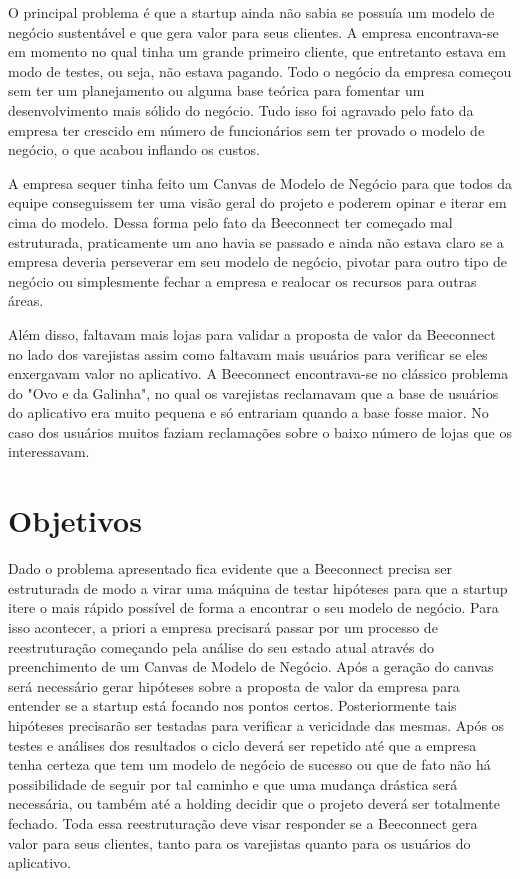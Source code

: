 O principal problema é que a startup ainda não sabia se possuía um modelo de negócio sustentável e que gera valor para seus clientes. A empresa encontrava-se em momento no qual tinha um grande primeiro cliente, que entretanto estava em modo de testes, ou seja, não estava pagando.
Todo o negócio da empresa começou sem ter um planejamento ou alguma base teórica para fomentar um desenvolvimento mais sólido do negócio. Tudo isso foi agravado pelo fato da empresa ter crescido em número de funcionários sem ter provado o modelo de negócio, o que acabou inflando os custos.

A empresa sequer tinha feito um Canvas de Modelo de Negócio para que todos da equipe conseguissem ter uma visão geral do projeto e poderem opinar e iterar em cima do modelo. Dessa forma pelo fato da Beeconnect ter começado mal estruturada, praticamente um ano havia se passado e ainda não estava claro se a empresa deveria perseverar em seu modelo de negócio, pivotar para outro tipo de negócio ou simplesmente fechar a empresa e realocar os recursos para outras áreas.

Além disso, faltavam mais lojas para validar a proposta de valor da Beeconnect no lado dos varejistas assim como faltavam mais usuários para verificar se eles enxergavam valor no aplicativo. A Beeconnect encontrava-se no clássico problema do "Ovo e da Galinha", no qual os varejistas reclamavam que a base de usuários do aplicativo era muito pequena e só entrariam quando a base fosse maior. No caso dos usuários muitos faziam reclamações sobre o baixo número de lojas que os interessavam.

\section[Objetivos]{Objetivos}
\label{chap:objetivos}
Dado o problema apresentado fica evidente que a Beeconnect precisa ser estruturada de modo a virar uma máquina de testar hipóteses para que a startup itere o mais rápido possível de forma a encontrar o seu modelo de negócio. Para isso acontecer, a priori a empresa precisará passar por um processo de reestruturação começando pela análise do seu estado atual através do preenchimento de um Canvas de Modelo de Negócio. Após a geração do canvas será necessário gerar hipóteses sobre a proposta de valor da empresa para entender se a startup está focando nos pontos certos. Posteriormente tais hipóteses precisarão ser testadas para verificar a vericidade das mesmas. Após os testes e análises dos resultados o ciclo deverá ser repetido até que a empresa tenha certeza que tem um modelo de negócio de sucesso ou que de fato não há possibilidade de seguir por tal caminho e que uma mudança drástica será necessária, ou também até a holding decidir que o projeto deverá ser totalmente fechado.
Toda essa reestruturação deve visar responder se a Beeconnect gera valor para seus clientes, tanto para os varejistas quanto para os usuários do aplicativo. 

